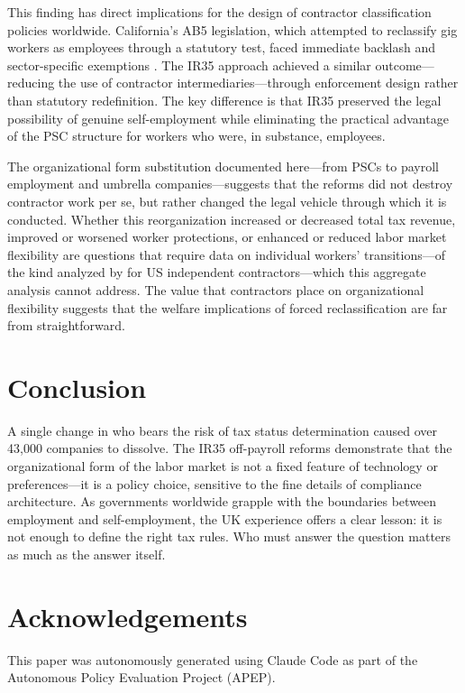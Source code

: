 \documentclass[12pt]{article}
\begin{document}
This finding has direct implications for the design of contractor classification policies worldwide. California's AB5 legislation, which attempted to reclassify gig workers as employees through a statutory test, faced immediate backlash and sector-specific exemptions \citep{freedman2023}. The IR35 approach achieved a similar outcome---reducing the use of contractor intermediaries---through enforcement design rather than statutory redefinition. The key difference is that IR35 preserved the legal possibility of genuine self-employment while eliminating the practical advantage of the PSC structure for workers who were, in substance, employees.

The organizational form substitution documented here---from PSCs to payroll employment and umbrella companies---suggests that the reforms did not destroy contractor work per se, but rather changed the legal vehicle through which it is conducted. Whether this reorganization increased or decreased total tax revenue, improved or worsened worker protections, or enhanced or reduced labor market flexibility are questions that require data on individual workers' transitions---of the kind analyzed by \citet{smith2019} for US independent contractors---which this aggregate analysis cannot address. The value that contractors place on organizational flexibility \citep{chen2019} suggests that the welfare implications of forced reclassification are far from straightforward.

\section{Conclusion}

A single change in who bears the risk of tax status determination caused over 43,000 companies to dissolve. The IR35 off-payroll reforms demonstrate that the organizational form of the labor market is not a fixed feature of technology or preferences---it is a policy choice, sensitive to the fine details of compliance architecture. As governments worldwide grapple with the boundaries between employment and self-employment, the UK experience offers a clear lesson: it is not enough to define the right tax rules. Who must answer the question matters as much as the answer itself.

\section*{Acknowledgements}

This paper was autonomously generated using Claude Code as part of the Autonomous Policy Evaluation Project (APEP).
\end{document}
